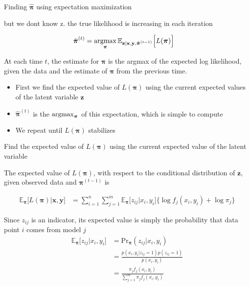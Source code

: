 \documentclass{beamer}
\newcommand{\eqn}[1]{\begin{align*}
#1
\end{align*}}
\newcommand{\vect}[1]{\boldsymbol{\mathbf{#1}}}
\newcommand{\bl}{\big\{}
\newcommand{\br}{\big\}}
\newcommand{\argmax}{\operatornamewithlimits{argmax}}
\newcommand{\vx}{\vect{x}}
\newcommand{\vy}{\vect{y}}
\newcommand{\vp}{\vect{\pi}}
\newcommand{\vph}{\hat{\vect{\pi}}}
\newcommand{\sumn}{\sum^n_{i=1}}
\newcommand{\summ}{\sum^m_{j=1}}
\newcommand{\fab}{f_j}
\newcommand{\llp}{L(\vp)}
\begin{document}
\begin{frame}{Finding $\vph$ using expectation maximization}
	
	but we dont know z.
	the true likelihood is increasing in each iteration
	
	\eqn{
		\vph^{(t)} &= \argmax_{\vp} \mathbb{E}_{\vect{z}| \vx,\vy,\vph^{(t-1)} }\Big[\llp \Big]   
	}
	
	At each time $t$, the estimate for $\vp$ is the argmax of the expected log likelihood, given the data and the estimate of $\vp$ from the previous time.
	
	\begin{itemize}
		\item First we find the expected value of $\llp$ using the current expected values of the latent variable $\vect{z}$
		\item $\vph^{(t)}$ is the $\argmax_{\vp}$ of this expectation, which is simple to compute
		\item We repeat until $\llp$ stabilizes
	\end{itemize}
	
	
	
	
\end{frame}






\begin{frame}{Find the expected value of $L(\vect{\pi})$ using the current expected value of the latent variable}
	
	The expected value of $\llp$, with respect to the conditional distribution of $\vect{z}$, given observed data and $\vp^{(t-1)}$ is
	
	\eqn{
		\mathbb{E}_{\vp}\Big[\llp \big| \vx,\vy \Big] &= \sumn \summ \mathbb{E}_{\vp}\big[z_{ij}|x_i,y_i\big] \bl \log \fab(x_i,y_i) + \log \pi_j  \br
	}
	
	Since $z_{ij}$ is an indicator, its expected value is simply the probability that data point $i$ comes from model $j$
	\eqn{
		\mathbb{E}_{\vp}\Big[  z_{ij} | x_i, y_i \Big]	&= \text{Pr}_{\vp}(z_{ij}|x_i,y_i)	\\
										&= \frac{p(x_i,y_i|z_{ij}=1)p(z_{ij}=1)}{p(x_i,y_i)}	\\
										&=  \frac{\pi_j \fab(x_i,y_i)  }{\summ \pi_j \fab(x_i,y_i)}
	}
	
	
		
	
\end{frame}
\end{document}
